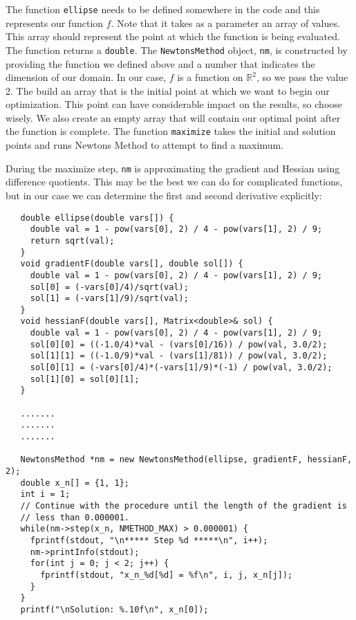 \documentclass{amsart}
\theoremstyle{plain}
\numberwithin{equation}{section}
\begin{document}
The function \verb|ellipse| needs to be defined somewhere in the code and this represents our function $f$. Note that it takes as a parameter an array of values. This array should represent the point at which the function is being evaluated. The function returns a \texttt{double}. The \verb|NewtonsMethod| object, \verb|nm|, is constructed by providing the function we defined above and a number that indicates the dimension of our domain. In our case, $f$ is a function on $\mathbb{R}^2$, so we pass the value $2$. The build an array that is the initial point at which we want to begin our optimization. This point can have considerable impact on the results, so choose wisely. We also create an empty array that will contain our optimal point after the function is complete. The function \verb|maximize| takes the initial and solution points and runs Newtons Method to attempt to find a maximum. \newline

During the maximize step, \verb|nm| is approximating the gradient and Hessian using difference quotients. This may be the best we can do for complicated functions, but in our case we can determine the first and second derivative explicitly: \newline

\begin{verbatim}
   double ellipse(double vars[]) {
     double val = 1 - pow(vars[0], 2) / 4 - pow(vars[1], 2) / 9;
     return sqrt(val);
   }
   void gradientF(double vars[], double sol[]) {
   	 double val = 1 - pow(vars[0], 2) / 4 - pow(vars[1], 2) / 9;
     sol[0] = (-vars[0]/4)/sqrt(val);
     sol[1] = (-vars[1]/9)/sqrt(val);
   }
   void hessianF(double vars[], Matrix<double>& sol) {
     double val = 1 - pow(vars[0], 2) / 4 - pow(vars[1], 2) / 9;
   	 sol[0][0] = ((-1.0/4)*val - (vars[0]/16)) / pow(val, 3.0/2);
   	 sol[1][1] = ((-1.0/9)*val - (vars[1]/81)) / pow(val, 3.0/2);
   	 sol[0][1] = (-vars[0]/4)*(-vars[1]/9)*(-1) / pow(val, 3.0/2);
   	 sol[1][0] = sol[0][1];
   }

   .......
   .......
   .......
	 
   NewtonsMethod *nm = new NewtonsMethod(ellipse, gradientF, hessianF, 2);
   double x_n[] = {1, 1};
   int i = 1;
   // Continue with the procedure until the length of the gradient is 
   // less than 0.000001.
   while(nm->step(x_n, NMETHOD_MAX) > 0.000001) {
     fprintf(stdout, "\n***** Step %d *****\n", i++);
     nm->printInfo(stdout);
     for(int j = 0; j < 2; j++) {
       fprintf(stdout, "x_n_%d[%d] = %f\n", i, j, x_n[j]);
     }
   }
   printf("\nSolution: %.10f\n", x_n[0]);
\end{verbatim}
\end{document}
